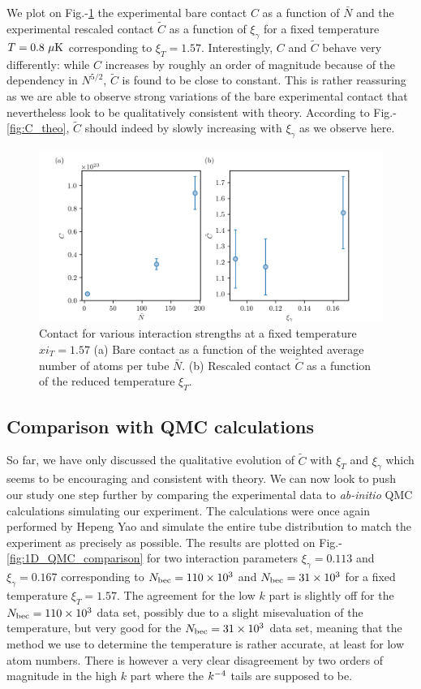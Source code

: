 We plot on Fig.-\ref{fig:C_vs_N} the experimental bare contact $C$ as a function of $\bar{N}$ and the experimental rescaled contact $\tilde{C}$ as a function of $\xi_{\gamma}$ for a fixed temperature $T=0.8 \ \mu \rm{K}$ corresponding to $\xi_T=1.57$. Interestingly, $C$ and $\tilde{C}$ behave very differently: while $C$ increases by roughly an order of magnitude because of the dependency in $N^{5/2}$, $\tilde{C}$ is found to be close to constant. This is rather reassuring as we are able to observe strong variations of the bare experimental contact that nevertheless look to be qualitatively consistent with theory. According to Fig.-\ref{fig:C_theo}, $\tilde{C}$ should indeed by slowly increasing with $\xi_{\gamma}$ as we observe here.

\begin{figure}
    \centering
    \includegraphics[width=\textwidth]{Fig/Chapter5/C_tilde_vs_N.png}
    \caption{Contact for various interaction strengths at a fixed temperature $xi_T=1.57$ (a) Bare contact as a function of the weighted average number of atoms per tube $\bar{N}$. (b) Rescaled contact $\tilde{C}$ as a function of the reduced temperature $\xi_T$.}
    \label{fig:C_vs_N}
\end{figure}

\subsection{Comparison with QMC calculations}

So far, we have only discussed the qualitative evolution of $\tilde{C}$ with $\xi_T$ and $\xi_{\gamma}$ which seems to be encouraging and consistent with theory. We can now look to push our study one step further by comparing the experimental data to {\it ab-initio} QMC calculations simulating our experiment. The calculations were once again performed by Hepeng Yao and simulate the entire tube distribution to match the experiment as precisely as possible. The results are plotted on Fig.-\ref{fig:1D_QMC_comparison} for two interaction parameters $\xi_{\gamma}=0.113$ and $\xi_{\gamma}=0.167$ corresponding to $N_{\rm{bec}}=110 \times 10^3$ and $N_{\rm{bec}}=31 \times 10^3$ for a fixed temperature $\xi_T=1.57$. The agreement for the low $k$ part is slightly off for the $N_{\rm{bec}}=110 \times 10^3$ data set, possibly due to a slight misevaluation of the temperature, but very good for the $N_{\rm{bec}}=31 \times 10^3$ data set, meaning that the method we use to determine the temperature is rather accurate, at least for low atom numbers. There is however a very clear disagreement by two orders of magnitude in the high $k$ part where the $k^{-4}$ tails are supposed to be.

